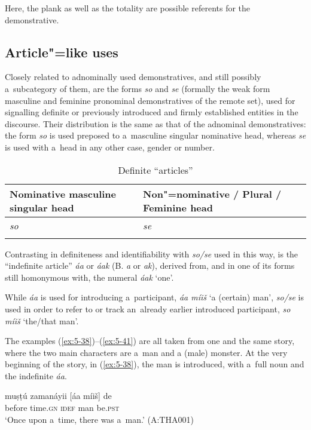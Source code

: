 Here, the plank as well as the totality are possible referents for the demonstrative.

\subsection{Article"=like uses}
\label{subsec:5-2-6}

Closely related to adnominally used demonstratives, and still possibly a~subcategory of them, are the forms \textit{so} and \textit{se} (formally the weak form masculine and feminine pronominal demonstratives of the remote set), used for signalling definite or previously introduced and firmly established entities in the discourse. Their distribution is the same as that of the adnominal demonstratives: the form \textit{so} is used preposed to a~masculine singular nominative head, whereas \textit{se} is used with a~head in any other case, gender or number. 


\begin{table}[ht]
 \caption{Definite ``articles''}
\begin{tabularx}{\textwidth}{ Q Q }
\lsptoprule
Nominative masculine singular head &
Non"=nominative / Plural / Feminine head\\\hline
\textit{so} &
\textit{se} \\\lspbottomrule
\end{tabularx}
\label{tab:5-5}
\end{table}

Contrasting in definiteness and identifiability with \textit{so/se} used in this way, is the ``indefinite article'' \textit{áa} or \textit{áak} (B. \textit{a} or \textit{ak}), derived from, and in one of its forms still homonymous with, the numeral \textit{áak} `one'.

While \textit{áa} is used for introducing a~participant, \textit{áa míiš} `a (certain) man', \textit{so/se} is used in order to refer to or track an~already earlier introduced participant, \textit{so míiš} `the/that man'.


  The examples (\ref{ex:5-38})--(\ref{ex:5-41}) are all taken from one and the same story, where the
  two main characters are a~man and a (male) monster. At the very beginning of the story, in
  (\ref{ex:5-38}), the man is introduced, with a~full noun and the indefinite \textit{áa}.

\begin{exe}
\ex
\label{ex:5-38}
\gll muṣṭú zamanáyii [áa míiš] de\\
before time.\textsc{gn} \textsc{idef} man be.\textsc{pst}\\
\glt `Once upon a~time, there was a~man.' (A:THA001)
\end{exe}

